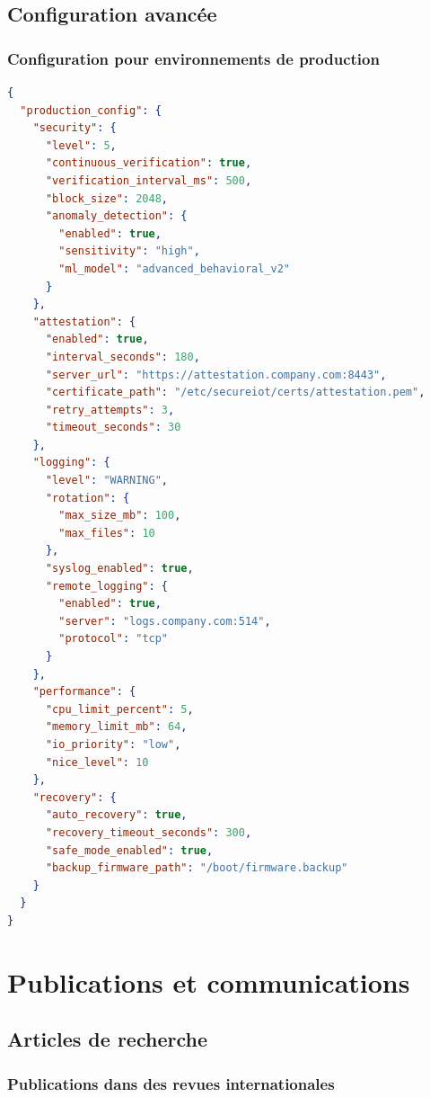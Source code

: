 \section{Configuration avancée}

\subsection{Configuration pour environnements de production}

\begin{lstlisting}[language=json, caption={Configuration de production}]
{
  "production_config": {
    "security": {
      "level": 5,
      "continuous_verification": true,
      "verification_interval_ms": 500,
      "block_size": 2048,
      "anomaly_detection": {
        "enabled": true,
        "sensitivity": "high",
        "ml_model": "advanced_behavioral_v2"
      }
    },
    "attestation": {
      "enabled": true,
      "interval_seconds": 180,
      "server_url": "https://attestation.company.com:8443",
      "certificate_path": "/etc/secureiot/certs/attestation.pem",
      "retry_attempts": 3,
      "timeout_seconds": 30
    },
    "logging": {
      "level": "WARNING",
      "rotation": {
        "max_size_mb": 100,
        "max_files": 10
      },
      "syslog_enabled": true,
      "remote_logging": {
        "enabled": true,
        "server": "logs.company.com:514",
        "protocol": "tcp"
      }
    },
    "performance": {
      "cpu_limit_percent": 5,
      "memory_limit_mb": 64,
      "io_priority": "low",
      "nice_level": 10
    },
    "recovery": {
      "auto_recovery": true,
      "recovery_timeout_seconds": 300,
      "safe_mode_enabled": true,
      "backup_firmware_path": "/boot/firmware.backup"
    }
  }
}
\end{lstlisting}

\chapter{Publications et communications}
\label{app:publications}

\section{Articles de recherche}

\subsection{Publications dans des revues internationales}

